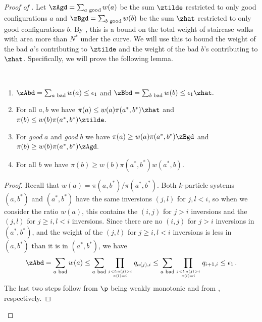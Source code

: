 \begin{proof}[Proof of ]
Let $\zAgd = \sum_{a \text{ good}} w(a)$ be the sum $\ztilde$ restricted 
to only good configurations $a$ and $\zBgd = \sum_{b \text{ good}} w(b)$ 
be the sum $\zhat$ restricted to only good configurations $b$. 
By , this is a bound on the total weight of 
staircase walks with area more than $N^*$ under the curve.  We will use 
this to bound the weight of the bad $a$'s contributing to $\ztilde$ and 
the weight of the bad $b$'s contributing to $\zhat$.  Specifically, we 
will prove the following lemma.

\begin{lemma}\label{lem:zBound}\ \  
  \begin{enumerate}
  \item $\zAbd =  \sum_{a \text{ bad}} w(a) \leq \epsilon_1$ and $\zBbd =  \sum_{b \text{ bad}} w(b) \leq \epsilon_1\zhat.$
 \item For all $a,b$ we have $\pi(a)\leq w(a)\pi(a^*,b^*)\zhat$ and $\pi(b)\leq w(b)\pi(a^*,b^*)\ztilde.$
 \item For \emph{good} $a$ and \emph{good} $b$ we have $\pi(a) \geq w(a) \pi(a^*,b^*)\zBgd$ and $\pi(b) \geq w(b) \pi(a^*,b^*)\zAgd.$
 \item For all $b$ we have $\pi(b) \geq w(b)\pi(a^*,b^*)w(a^*,b).$
    \end{enumerate}
    \end{lemma}
\begin{proof}
 Recall that $w(a) = \pi(a,b^*)/\pi(a^*,b^*).$  Both $k$-particle 
systems $(a,b^*)$ and $(a^*,b^*)$ have the same inversions $(j,l)$ for 
$j,l < i$, so when we consider the ratio $w(a)$, this contains the 
$(i,j)$ for $j > i$ inversions and the $(j,l)$ for $j \geq i, l < i$ 
inversions. Since there are no $(i,j)$ for $j > i$ inversions in 
$(a^*,b^*)$, and the weight of the $(j,l)$ for $j \geq i, l < i$ 
inversions is less in $(a,b^*)$ than it is in $(a^*,b^*)$, we have 
$$\zAbd =  \sum_{a \text{ bad}} w(a) \leq \sum_{a \text{ 
bad}}\prod_{j<l: a(j) > i \atop a(l) = i}q_{a(j), i} \leq \sum_{a 
\text{ bad}}\prod_{j<l: a(j) > i \atop a(l) = i}q_{i+1, i} \leq 
\epsilon_1\,.$$ The last two steps follow from $\p$ being weakly 
monotonic and
from  %
, respectively.   


\end{proof}
\end{proof}
